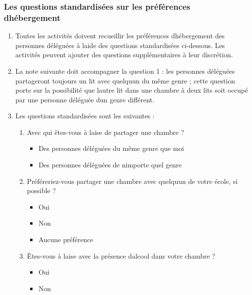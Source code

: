 \subsubsection{Les questions standardisées sur les préférences d\textquotesingle hébergement}
\label{questions-standardisees-chambres}

\begin{enumerate}
 \item
  Toutes les activités doivent recueillir les préférences d\textquotesingle hébergement des personnes déléguées à l\textquotesingle aide des questions standardisées ci-dessous. Les activités peuvent ajouter des questions supplémentaires à leur discrétion.
 \item
  La note suivante doit accompagner la question 1 : les personnes déléguées partageront toujours un lit avec quelqu\textquotesingle un du même genre ; cette question porte sur la possibilité que l\textquotesingle autre lit dans une chambre à deux lits soit occupé par une personne déléguée d\textquotesingle un genre différent.
 \item
  Les questions standardisées sont les suivantes :

  \begin{enumerate}
   \item
    Avec qui êtes-vous à l\textquotesingle aise de partager une chambre ?
    \begin{itemize}
     \item Des personnes déléguées du même genre que moi
     \item Des personnes déléguées de n\textquotesingle importe quel genre
    \end{itemize}

   \item
    Préféreriez-vous partager une chambre avec quelqu\textquotesingle un de votre école, si possible ?
    \begin{itemize}
     \item Oui
     \item Non
     \item Aucune préférence
    \end{itemize}

   \item
    Êtes-vous à l\textquotesingle aise avec la présence d\textquotesingle alcool dans votre chambre ?
    \begin{itemize}
     \item Oui
     \item Non
    \end{itemize}


\end{enumerate}
\end{enumerate}
